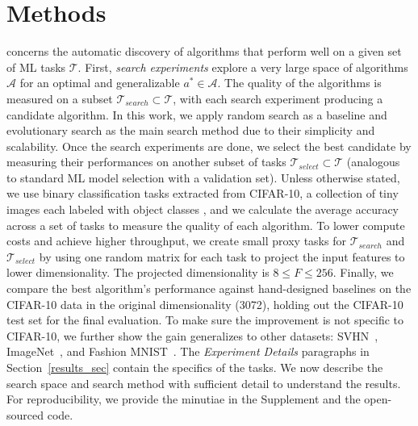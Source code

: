 \section{Methods}
\label{methods_sec}

\amlz concerns the automatic discovery of algorithms that perform well on a given set of ML tasks $\mathcal{T}$. First, \emph{search experiments} explore a very large space of algorithms $\mathcal{A}$ for an optimal and generalizable $a^* \in \mathcal{A}$. 
The quality of the algorithms is measured on a subset $\mathcal{T}_{search} \subset \mathcal{T}$, with each search experiment producing a candidate algorithm.
In this work, we apply random search as a baseline and evolutionary search as the main search method due to their simplicity and scalability. 
Once the search experiments are done, we select the best candidate by measuring their performances on another subset of tasks $\mathcal{T}_{select} \subset \mathcal{T}$ (\mbox{analo}gous to standard ML model selection with a validation set). Unless otherwise stated, we use binary classification tasks extracted from CIFAR-10, a collection of tiny images each labeled with object classes \cite{krizhevsky2009learning}, and we calculate the average accuracy across a set of tasks to measure the quality of each algorithm. To lower compute costs and achieve higher throughput, we create small proxy tasks for $\mathcal{T}_{search}$ and $\mathcal{T}_{select}$ by using one random matrix for each task to project the input features to lower dimensionality. The projected dimensionality is $8 \leq F \leq 256$. Finally, we compare the best algorithm's performance against hand-designed baselines on the CIFAR-10 data in the original dimensionality (3072), holding out the CIFAR-10 test set for the final evaluation. To make sure the improvement is not specific to CIFAR-10, we further show the gain generalizes to other datasets: SVHN~\cite{netzer2011reading}, ImageNet~\cite{chrabaszcz2017downsampled}, and Fashion MNIST~\cite{xiao2017fashion}. The \textit{Experiment Details} paragraphs in Section~\ref{results_sec} contain the specifics of the tasks. We now describe the search space and search method with sufficient detail to understand the results. For reproducibility, we provide the minutiae in the Supplement and the open-sourced code.


